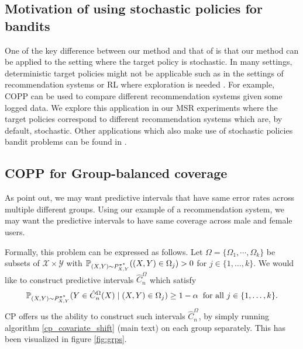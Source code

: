 \subsection{Motivation of using stochastic policies for bandits}
One of the key difference between our method and that of \cite{lei2020conformal} is that our method can be applied to the setting where the target policy is stochastic. In many settings, deterministic target policies might not be applicable such as in the settings of recommendation systems or RL where exploration is needed \citep{swaminathan2016off, su2020doubly}. For example, COPP can be used to compare different recommendation systems given some logged data. We explore this application in our MSR experiments where the target policies correspond to different recommendation systems which are, by default, stochastic. Other applications which also make use of stochastic policies bandit problems can be found in \cite{su2020doubly, farajtabar2018more}.



%
%
%
%

%
%

%

%
%
%

%


%







\subsection{COPP for Group-balanced coverage}\label{sec:grp-bal}
As \cite{conf-bates} point out, we may want predictive intervals that have same error rates across multiple different groups. Using our example of a recommendation system, we may want the predictive intervals to have same coverage across male and female users. 

Formally, this problem can be expressed as follows. Let $\Omega = \{\Omega_1, \cdots, \Omega_k \}$ be subsets of $\mathcal{X} \times \mathcal{Y}$ with $\mathbb{P}_{(X,Y)\sim P^{\pi^*}_{X,Y}}((X,Y) \in \Omega_j) > 0$ for $j\in \{1, \dots, k\}$. We would like to construct  predictive intervals $\hat{C}_n^\Omega$ which satisfy 
\begin{align}
    \mathbb{P}_{(X,Y)\sim P^{\pi^*}_{X,Y}}(Y \in \hat{C}_n^\Omega(X) \mid (X, Y) \in  \Omega_j) \geq 1-\alpha \hspace{0.2cm} \textup{for all $j\in \{1, \dots, k\}$.} \nonumber
\end{align}
CP offers us the ability to construct such intervals $\hat{C}_n^\Omega$, by simply running algorithm \ref{cp_covariate_shift} (main text) on each group separately. This has been visualized in figure \ref{fig:grps}. 

